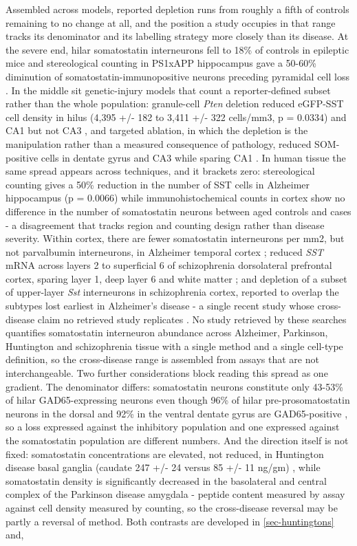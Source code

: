 \documentclass[11pt]{article}
\begin{document}
Assembled across models, reported depletion runs from roughly a fifth of controls remaining to no change at all, and the position a study occupies in that range tracks its denominator and its labelling strategy more closely than its disease. At the severe end, hilar somatostatin interneurons fell to 18\% of controls in epileptic mice \citep{Hofmann2016} and stereological counting in PS1xAPP hippocampus gave a 50-60\% diminution of somatostatin-immunopositive neurons preceding pyramidal cell loss \citep{Ramos2006}. In the middle sit genetic-injury models that count a reporter-defined subset rather than the whole population: granule-cell \emph{Pten} deletion reduced eGFP-SST cell density in hilus (4,395 +/- 182 to 3,411 +/- 322 cells/mm3, p = 0.0334) and CA1 but not CA3 \citep{Drake2024}, and targeted ablation, in which the depletion is the manipulation rather than a measured consequence of pathology, reduced SOM-positive cells in dentate gyrus and CA3 while sparing CA1 \citep{Nagarajan2023}. In human tissue the same spread appears across techniques, and it brackets zero: stereological counting gives a 50\% reduction in the number of SST cells in Alzheimer hippocampus (p = 0.0066) \citep{GonzalezRodriguez2021} while immunohistochemical counts in cortex show no difference in the number of somatostatin neurons between aged controls and cases \citep{Li1996b} - a disagreement that tracks region and counting design rather than disease severity. Within cortex, there are fewer somatostatin interneurons per mm2, but not parvalbumin interneurons, in Alzheimer temporal cortex \citep{Waller2020}; reduced \emph{SST} mRNA across layers 2 to superficial 6 of schizophrenia dorsolateral prefrontal cortex, sparing layer 1, deep layer 6 and white matter \citep{Morris2008}; and depletion of a subset of upper-layer \emph{Sst} interneurons in schizophrenia cortex, reported to overlap the subtypes lost earliest in Alzheimer's disease - a single recent study whose cross-disease claim no retrieved study replicates \citep{Endresz2026}. No study retrieved by these searches quantifies somatostatin interneuron abundance across Alzheimer, Parkinson, Huntington and schizophrenia tissue with a single method and a single cell-type definition, so the cross-disease range is assembled from assays that are not interchangeable. Two further considerations block reading this spread as one gradient. The denominator differs: somatostatin neurons constitute only 43-53\% of hilar GAD65-expressing neurons even though 96\% of hilar pre-prosomatostatin neurons in the dorsal and 92\% in the ventral dentate gyrus are GAD65-positive \citep{Esclapez1995}, so a loss expressed against the inhibitory population and one expressed against the somatostatin population are different numbers. And the direction itself is not fixed: somatostatin concentrations are elevated, not reduced, in Huntington disease basal ganglia (caudate 247 +/- 24 versus 85 +/- 11 ng/gm) \citep{Aronin1983}, while somatostatin density is significantly decreased in the basolateral and central complex of the Parkinson disease amygdala \citep{FloresCuadrado2017} - peptide content measured by assay against cell density measured by counting, so the cross-disease reversal may be partly a reversal of method. Both contrasts are developed in \ref{sec-huntingtons} and, 
\end{document}
